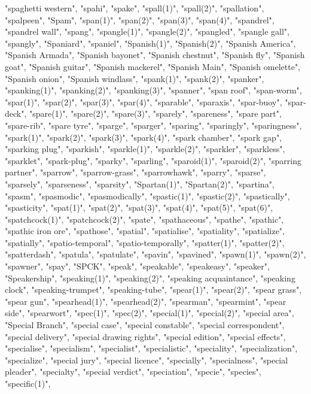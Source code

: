 "spaghetti western",
"spahi",
"spake",
"spall(1)",
"spall(2)",
"spallation",
"spalpeen",
"Spam",
"span(1)",
"span(2)",
"span(3)",
"span(4)",
"spandrel",
"spandrel wall",
"spang",
"spangle(1)",
"spangle(2)",
"spangled",
"spangle gall",
"spangly",
"Spaniard",
"spaniel",
"Spanish(1)",
"Spanish(2)",
"Spanish America",
"Spanish Armada",
"Spanish bayonet",
"Spanish chestnut",
"Spanish fly",
"Spanish goat",
"Spanish guitar",
"Spanish mackerel",
"Spanish Main",
"Spanish omelette",
"Spanish onion",
"Spanish windlass",
"spank(1)",
"spank(2)",
"spanker",
"spanking(1)",
"spanking(2)",
"spanking(3)",
"spanner",
"span roof",
"span-worm",
"spar(1)",
"spar(2)",
"spar(3)",
"spar(4)",
"sparable",
"sparaxis",
"spar-buoy",
"spar-deck",
"spare(1)",
"spare(2)",
"spare(3)",
"sparely",
"spareness",
"spare part",
"spare-rib",
"spare tyre",
"sparge",
"sparger",
"sparing",
"sparingly",
"sparingness",
"spark(1)",
"spark(2)",
"spark(3)",
"spark(4)",
"spark chamber",
"spark gap",
"sparking plug",
"sparkish",
"sparkle(1)",
"sparkle(2)",
"sparkler",
"sparkless",
"sparklet",
"spark-plug",
"sparky",
"sparling",
"sparoid(1)",
"sparoid(2)",
"sparring partner",
"sparrow",
"sparrow-grass",
"sparrowhawk",
"sparry",
"sparse",
"sparsely",
"sparseness",
"sparsity",
"Spartan(1)",
"Spartan(2)",
"spartina",
"spasm",
"spasmodic",
"spasmodically",
"spastic(1)",
"spastic(2)",
"spastically",
"spasticity",
"spat(1)",
"spat(2)",
"spat(3)",
"spat(4)",
"spat(5)",
"spat(6)",
"spatchcock(1)",
"spatchcock(2)",
"spate",
"spathaceous",
"spathe",
"spathic",
"spathic iron ore",
"spathose",
"spatial",
"spatialise",
"spatiality",
"spatialize",
"spatially",
"spatio-temporal",
"spatio-temporally",
"spatter(1)",
"spatter(2)",
"spatterdash",
"spatula",
"spatulate",
"spavin",
"spavined",
"spawn(1)",
"spawn(2)",
"spawner",
"spay",
"SPCK",
"speak",
"speakable",
"speakeasy",
"speaker",
"Speakership",
"speaking(1)",
"speaking(2)",
"speaking acquaintance",
"speaking clock",
"speaking-trumpet",
"speaking-tube",
"spear(1)",
"spear(2)",
"spear grass",
"spear gun",
"spearhead(1)",
"spearhead(2)",
"spearman",
"spearmint",
"spear side",
"spearwort",
"spec(1)",
"spec(2)",
"special(1)",
"special(2)",
"special area",
"Special Branch",
"special case",
"special constable",
"special correspondent",
"special delivery",
"special drawing rights",
"special edition",
"special effects",
"specialise",
"specialism",
"specialist",
"specialistic",
"speciality",
"specialization",
"specialize",
"special jury",
"special licence",
"specially",
"specialness",
"special pleader",
"specialty",
"special verdict",
"speciation",
"specie",
"species",
"specific(1)",
